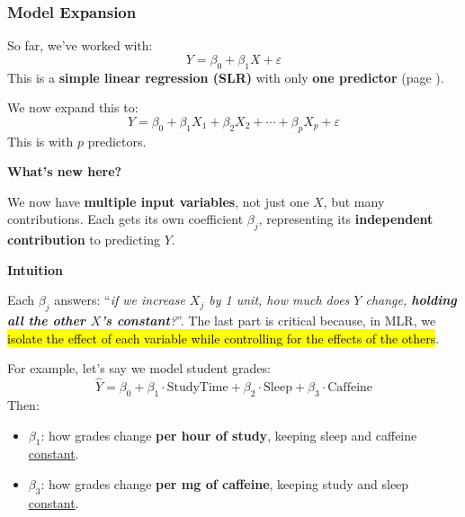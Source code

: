 \newpage

\subsubsection{Model Expansion}\label{subsubsection: Model Expansion}

So far, we've worked with:
\begin{equation*}
    Y = \beta_0 + \beta_1 X + \varepsilon
\end{equation*}
This is a \textbf{simple linear regression (SLR)} with only \textbf{one predictor} (page \pageref{subsection: Simple Linear Regression}).

\highspace
We now expand this to:
\begin{equation}
    Y = \beta_0 + \beta_1 X_1 + \beta_2 X_2 + \cdots + \beta_p X_p + \varepsilon
\end{equation}
This is  with $p$ predictors.

\highspace
\begin{flushleft}
    \textcolor{Green3}{ \textbf{What's new here?}}
\end{flushleft}
We now have \textbf{multiple input variables}, not just one $X$, but many contributions. Each gets its own coefficient $\beta_j$, representing its \textbf{independent contribution} to predicting $Y$.

\highspace
\begin{flushleft}
    \textcolor{Green3}{ \textbf{Intuition}}
\end{flushleft}
Each $\beta_j$ answers: ``\emph{if we increase $X_j$ by 1 unit, how much does $Y$ change, \textbf{holding all the other $X$'s constant}?}''. The last part is critical because, in MLR, we \hl{isolate the effect of each variable while controlling for the effects of the others}.

\highspace
For example, let's say we model student grades:
\begin{equation*}
    \hat{Y} = \beta_0 + \beta_1 \cdot \text{StudyTime} + \beta_2 \cdot \text{Sleep} + \beta_3 \cdot \text{Caffeine}
\end{equation*}
Then:
\begin{itemize}
    \item $\beta_1$: how grades change \textbf{per hour of study}, keeping sleep and caffeine \underline{constant}.
    \item $\beta_3$: how grades change \textbf{per mg of caffeine}, keeping study and sleep \underline{constant}.
\end{itemize}

